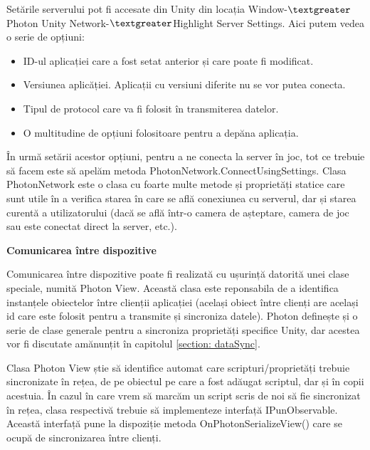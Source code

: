 \documentclass[12pt, a4paper]{article}
\begin{document}
	Setările serverului pot fi accesate din Unity din locația Window-$\textgreater$Photon Unity Network-$\textgreater$Highlight Server Settings. Aici putem vedea o serie de opțiuni:
	
	\begin{itemize}
		\item ID-ul aplicației care a fost setat anterior și care poate fi modificat.
		\item Versiunea aplicăției. Aplicații cu versiuni diferite nu se vor putea conecta.
		\item Tipul de protocol care va fi folosit în transmiterea datelor.
		\item O multitudine de opțiuni folositoare pentru a depăna aplicația.
	\end{itemize}
	
	În urmă setării acestor opțiuni, pentru a ne conecta la server în joc, tot ce trebuie să facem este să apelăm metoda PhotonNetwork.ConnectUsingSettings. Clasa PhotonNetwork este o clasa cu foarte multe metode și proprietăți statice care sunt utile în a verifica starea în care se află conexiunea cu serverul, dar și starea curentă a utilizatorului (dacă se află într-o camera de așteptare, camera de joc sau este conectat direct la server, etc.).
	\newline
	

	
	
	\textbf{Comunicarea între dispozitive}
	\newline
	
	Comunicarea între dispozitive poate fi realizată cu ușurință datorită unei clase speciale, numită Photon View. Această clasa este reponsabila de a identifica instanțele obiectelor între clienții aplicației (același obiect între clienți are același id care este folosit pentru a transmite și sincroniza datele). Photon definește și o serie de clase generale pentru a sincroniza proprietăți specifice Unity, dar acestea vor fi discutate amănunțit în capitolul \ref{section: dataSync}.
	\newline
	
	Clasa Photon View știe să identifice automat care scripturi/proprietăți trebuie sincronizate în rețea, de pe obiectul pe care a fost adăugat scriptul, dar și în copii acestuia. În cazul în care vrem să marcăm un script scris de noi să fie sincronizat în rețea, clasa respectivă trebuie să implementeze interfață IPunObservable. Această interfață pune la dispoziție metoda OnPhotonSerializeView() care se ocupă de sincronizarea între clienți.
	\newline
	
\end{document}
